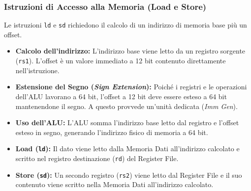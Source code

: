 \documentclass[12pt, a4paper]{article}
\begin{document}
\subsubsection{Istruzioni di Accesso alla Memoria (Load e Store)}
Le istruzioni \texttt{ld} e \texttt{sd} richiedono il calcolo di un indirizzo di memoria base più un offset.
\begin{itemize}
    \item \textbf{Calcolo dell'indirizzo:} L'indirizzo base viene letto da un registro sorgente (\texttt{rs1}). L'offset è un valore immediato a 12 bit contenuto direttamente nell'istruzione.
    \item \textbf{Estensione del Segno (\textit{Sign Extension}):} Poiché i registri e le operazioni dell'ALU lavorano a 64 bit, l'offset a 12 bit deve essere esteso a 64 bit mantenendone il segno. A questo provvede un'unità dedicata (\textit{Imm Gen}).
    \item \textbf{Uso dell'ALU:} L'ALU somma l'indirizzo base letto dal registro e l'offset esteso in segno, generando l'indirizzo fisico di memoria a 64 bit.
    \item \textbf{Load (\texttt{ld}):} Il dato viene letto dalla Memoria Dati all'indirizzo calcolato e scritto nel registro destinazione (\texttt{rd}) del Register File.
    \item \textbf{Store (\texttt{sd}):} Un secondo registro (\texttt{rs2}) viene letto dal Register File e il suo contenuto viene scritto nella Memoria Dati all'indirizzo calcolato.
\end{itemize}
\end{document}
